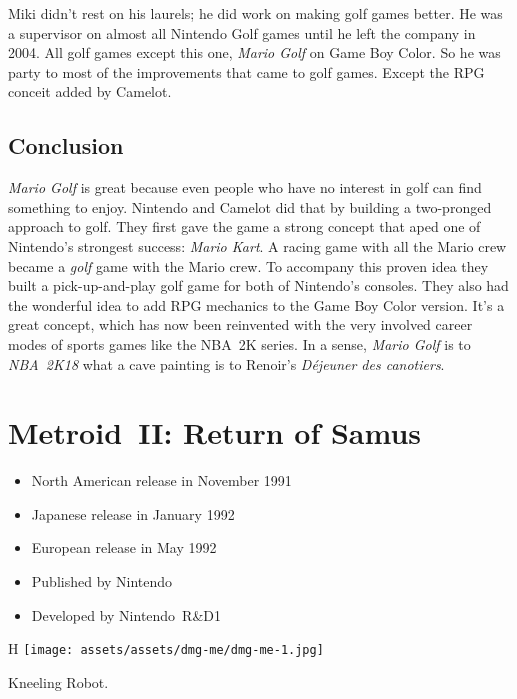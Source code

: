 \documentclass{book}
\begin{document}
Miki didn’t rest on his laurels; he did work on making golf games better. He was a supervisor on almost all Nintendo Golf games until he left the company in 2004. All golf games except this one, \emph{Mario Golf} on Game Boy Color. So he was party to most of the improvements that came to golf games. Except the RPG conceit added by Camelot.

\FloatBarrier\needspace{10mm}\section*{Conclusion}\nopagebreak[4]

\emph{Mario Golf} is great because even people who have no interest in golf can find something to enjoy. Nintendo and Camelot did that by building a two-pronged approach to golf. They first gave the game a strong concept that aped one of Nintendo’s strongest success: \emph{Mario Kart}. A racing game with all the Mario crew became a \emph{golf} game with the Mario crew. To accompany this proven idea they built a pick-up-and-play golf game for both of Nintendo’s consoles. They also had the wonderful idea to add RPG mechanics to the Game Boy Color version. It’s a great concept, which has now been reinvented with the very involved career modes of sports games like the NBA 2K series. In a sense, \emph{Mario Golf} is to \emph{NBA 2K18} what a cave painting is to Renoir’s \emph{Déjeuner des canotiers}.


\begingroup \chapter*{Metroid II: Return of Samus} \endgroup

\begin{itemize} \setlength\itemsep{-0.4em}
\item North American release in November 1991
\item Japanese release in January 1992
\item European release in May 1992
\item Published by Nintendo
\item Developed by Nintendo R\&D1
\end{itemize}\noindent

\begin{wrapfigure}{H}{\linewidth}
\vskip 4pt
\centering \texttt{[image: assets/assets/dmg-me/dmg-me-1.jpg]}\par\pagetwodescription Kneeling Robot.\end{wrapfigure}
\clearpage
\end{document}
